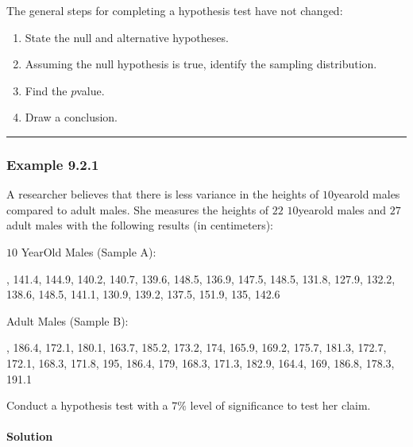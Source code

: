 \documentclass[letterpaper,10pt,english]{jupyterBook}
\begin{document}
\sphinxAtStartPar
The general steps for completing a hypothesis test have not changed:
\begin{enumerate}
%
\item {} 
\sphinxAtStartPar
State the null and alternative hypotheses.

\item {} 
\sphinxAtStartPar
Assuming the null hypothesis is true, identify the sampling distribution.

\item {} 
\sphinxAtStartPar
Find the \(p\)\sphinxhyphen{}value.

\item {} 
\sphinxAtStartPar
Draw a conclusion.

\end{enumerate}


\bigskip\hrule\bigskip



\subsubsection{Example 9.2.1}
\label{\detokenize{Ch9 Hypothesis Tests of Two or More Populations/9.2 Hypothesis Testing Two Population Variances:example-9-2-1}}
\sphinxAtStartPar
A researcher believes that there is less variance in the heights of \(10\)\sphinxhyphen{}year\sphinxhyphen{}old males compared to adult males. She measures the heights of \(22\) \(10\)\sphinxhyphen{}year\sphinxhyphen{}old males and \(27\) adult males with the following results (in centimeters):

\sphinxAtStartPar
\(10\) Year\sphinxhyphen{}Old Males (Sample A):

, 141.4, 144.9, 140.2, 140.7, 139.6, 148.5, 136.9, 147.5, 148.5, 131.8, 127.9, 132.2, 138.6, 148.5, 141.1, 130.9, 139.2, 137.5, 151.9, 135, 142.6

\sphinxAtStartPar
Adult Males (Sample B):

, 186.4, 172.1, 180.1, 163.7, 185.2, 173.2, 174, 165.9, 169.2, 175.7, 181.3, 172.7, 172.1, 168.3, 171.8, 195, 186.4, 179, 168.3, 171.3, 182.9, 164.4, 169, 186.8, 178.3, 191.1

\sphinxAtStartPar
Conduct a hypothesis test with a \(7\%\) level of significance to test her claim.


\paragraph{Solution}
\label{\detokenize{Ch9 Hypothesis Tests of Two or More Populations/9.2 Hypothesis Testing Two Population Variances:solution}}
\end{document}

